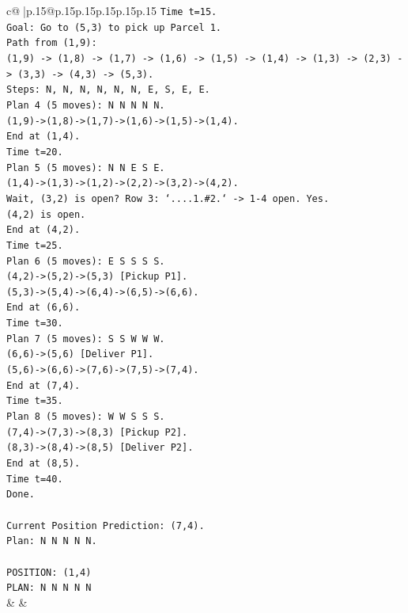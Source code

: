 \documentclass{article}
\begin{document}
{\begin{supertabular}{c@{$\;$}|p{.15\linewidth}@{}p{.15\linewidth}p{.15\linewidth}p{.15\linewidth}p{.15\linewidth}p{.15\linewidth}}
{{{\texttt{Time t=15.} \\
\texttt{Goal: Go to (5,3) to pick up Parcel 1.} \\
\texttt{Path from (1,9):} \\
\texttt{(1,9) {-}> (1,8) {-}> (1,7) {-}> (1,6) {-}> (1,5) {-}> (1,4) {-}> (1,3) {-}> (2,3) {-}> (3,3) {-}> (4,3) {-}> (5,3).} \\
\texttt{Steps: N, N, N, N, N, N, E, S, E, E.} \\
\texttt{Plan 4 (5 moves): N N N N N.} \\
\texttt{(1,9){-}>(1,8){-}>(1,7){-}>(1,6){-}>(1,5){-}>(1,4).} \\
\texttt{End at (1,4).} \\
\texttt{Time t=20.} \\
\texttt{Plan 5 (5 moves): N N E S E.} \\
\texttt{(1,4){-}>(1,3){-}>(1,2){-}>(2,2){-}>(3,2){-}>(4,2).} \\
\texttt{Wait, (3,2) is open? Row 3: `....1.\#2.` {-}> 1{-}4 open. Yes.} \\
\texttt{(4,2) is open.} \\
\texttt{End at (4,2).} \\
\texttt{Time t=25.} \\
\texttt{Plan 6 (5 moves): E S S S S.} \\
\texttt{(4,2){-}>(5,2){-}>(5,3) {[}Pickup P1{]}.} \\
\texttt{(5,3){-}>(5,4){-}>(6,4){-}>(6,5){-}>(6,6).} \\
\texttt{End at (6,6).} \\
\texttt{Time t=30.} \\
\texttt{Plan 7 (5 moves): S S W W W.} \\
\texttt{(6,6){-}>(5,6) {[}Deliver P1{]}.} \\
\texttt{(5,6){-}>(6,6){-}>(7,6){-}>(7,5){-}>(7,4).} \\
\texttt{End at (7,4).} \\
\texttt{Time t=35.} \\
\texttt{Plan 8 (5 moves): W W S S S.} \\
\texttt{(7,4){-}>(7,3){-}>(8,3) {[}Pickup P2{]}.} \\
\texttt{(8,3){-}>(8,4){-}>(8,5) {[}Deliver P2{]}.} \\
\texttt{End at (8,5).} \\
\texttt{Time t=40.} \\
\texttt{Done.} \\
\\ 
\texttt{Current Position Prediction: (7,4).} \\
\texttt{Plan: N N N N N.} \\
\\ 
\texttt{POSITION: (1,4)} \\
\texttt{PLAN: N N N N N} \\
            }
        }
    }
    & & \\ \\


\end{supertabular}}
\end{document}
